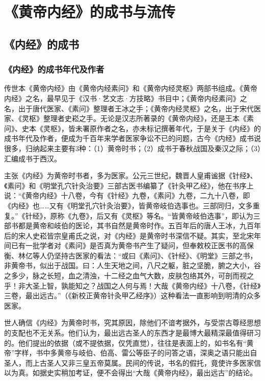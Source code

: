 \documentclass[draft,12pt]{ctexbook}
\begin{document}
\pagestyle{main}
\fi
\chapter{《黄帝内经》的成书与流传} %

\section{《内经》的成书}%

\subsection{《内经》的成书年代及作者} %

传世本《黄帝内经》由《黄帝内经素问》和《黄帝内经灵枢》两部书组成。《黄帝内经》之名，最早见于《汉书·艺文志·方技略》书目中；《黄帝内经素问》之名，出于唐代医家、《素问》整理者王冰之手；《黄帝内经灵枢》之名，出于宋代医家、《灵枢》整理者史崧之手。无论是汉志所著录的《黄帝内经》，还是王本《素问》、史本《灵枢》，皆未署原作者之名，亦未标记撰著年代，于是关于《内经》的成书年代及作者，便成为千百年来学者医家争讼不已的问题，古今《内经》成书说很多，归纳起来主要有3种：（1）黄帝时书；（2）成书于春秋战国及秦汉之际；（3）汇编成书于西汉。

主张《内经》为黄帝时书者，多为医家。公元三世纪，魏晋人皇甫谧据《针经》、《素问》和《明堂孔穴针灸治要》三部古医书编纂了《针灸甲乙经》，他在书序上说：“《黄帝内经》十八卷，今有《针经》九卷，《素问》九卷，二九十八卷，即《内经》也……又有《明堂孔穴针灸治要》，皆黄帝岐伯选事也。三部同归，文多重复。”《针经》，原称《九卷》，后又有《灵枢》等名。“皆黄帝岐伯选事”，即认为三部书都是黄帝和岐伯的医论，其书自然是黄帝时作。五百年后的唐人王冰，九百年后的宋人史崧皆宗皇甫氏之说，对《内经》是黄帝时书深信不疑。其实，至北宋年间已有一批学者对《素问》是否真为黄帝书产生了疑问，但奉敕校正医书的高保衡、林亿等人仍坚持古医家的看法：“或曰《素问》、《针经》、《明堂》三部之书，非黄帝书，似出于战国。曰：人生天地之间，八尺之躯，脏之坚脆，腑之大小，谷之多少，脉之长短，血之清浊，十二经之血气大数，皮肤包络其外，可剖而视之乎！非大圣上智，孰能知之？战国之人何与焉！大哉《黄帝内经》十八卷，《针经》三卷，最出远古。”（《新校正黄帝针灸甲乙经序》）这种看法一直影响到明清的众多医家。

世人确信《内经》为黄帝时书，究其原因，除他们不谙考据外，与受崇古尊经思想的支配也不无关系。他们认为，最出远古圣人的东西才是最博大最精深最值得研习的。他们提出的依据（或不提依据，仅凭直觉），往往是表面上的，如书名有“黄帝”字样，书中多黄帝与岐伯、伯高、雷公等臣子的问答之语，深奥之语只能出自圣人，而上古圣人又非三皇五帝莫属。民间的传说，书名的假托，竟使许多医家信以为真。如据史实稍加考证，便不会得出“大哉《黄帝内经》，最出远古”的结论。
\end{document}
